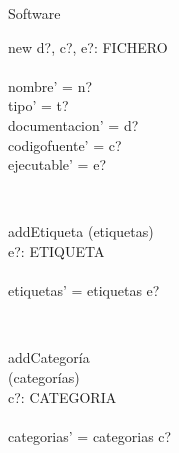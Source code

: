 \documentclass[11pt]{article}
\begin{document}
\begin{class}{Software}
\begin{op}{new}
d?, c?, e?: FICHERO\\
\ST\\
nombre' = n?\\
tipo' = t?\\
documentacion' =  d? \\
codigofuente' = c?\\
ejecutable' = e?\\
\end{op}\\
\begin{op}{addEtiqueta}
\Delta (etiquetas) \\
e?: ETIQUETA\\
\ST\\
etiquetas' = etiquetas \union e?\\
\end{op}\\
\begin{op}{addCategoría}\\
\Delta (categorías) \\
c?: CATEGORIA\\
\ST\\
categorias' = categorias \union c?\\
\end{op}\\
\end{class}\\
\end{document}
